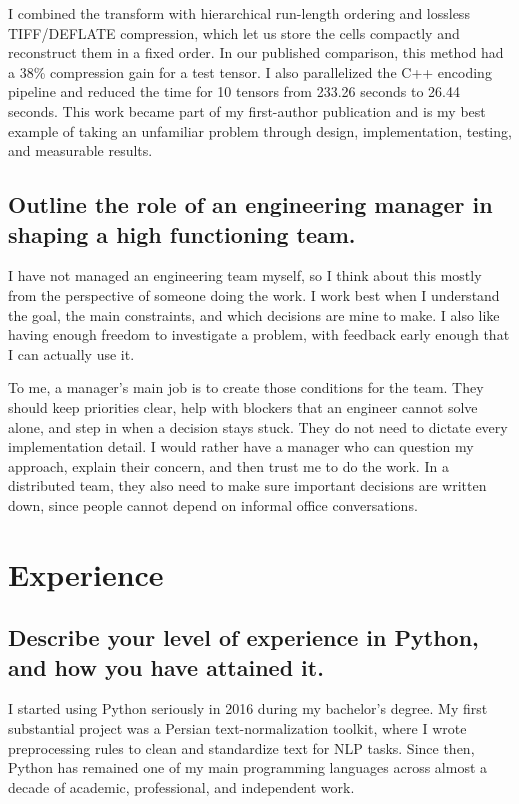 \documentclass[11pt]{article}
\begin{document}
I combined the transform with hierarchical run-length ordering and lossless TIFF/DEFLATE compression, which let us store the cells compactly and reconstruct them in a fixed order. In our published comparison, this method had a 38\% compression gain for a test tensor. I also parallelized the C++ encoding pipeline and reduced the time for 10 tensors from 233.26 seconds to 26.44 seconds. This work became part of my first-author publication and is my best example of taking an unfamiliar problem through design, implementation, testing, and measurable results.

\subsection*{Outline the role of an engineering manager in shaping a high functioning team.}

I have not managed an engineering team myself, so I think about this mostly from the perspective of someone doing the work. I work best when I understand the goal, the main constraints, and which decisions are mine to make. I also like having enough freedom to investigate a problem, with feedback early enough that I can actually use it.

To me, a manager's main job is to create those conditions for the team. They should keep priorities clear, help with blockers that an engineer cannot solve alone, and step in when a decision stays stuck. They do not need to dictate every implementation detail. I would rather have a manager who can question my approach, explain their concern, and then trust me to do the work. In a distributed team, they also need to make sure important decisions are written down, since people cannot depend on informal office conversations.

\section*{Experience}

\subsection*{Describe your level of experience in Python, and how you have attained it.}

I started using Python seriously in 2016 during my bachelor's degree. My first substantial project was a Persian text-normalization toolkit, where I wrote preprocessing rules to clean and standardize text for NLP tasks. Since then, Python has remained one of my main programming languages across almost a decade of academic, professional, and independent work.
\end{document}
